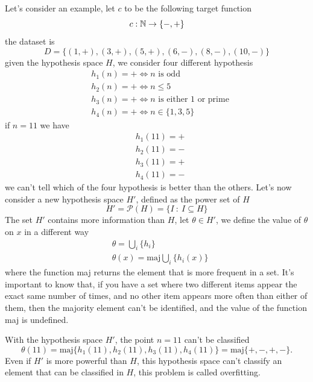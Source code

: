 \documentclass[10pt, letterpaper]{report}
\begin{document}
Let's consider an example, let $c$ to be the following target function\begin{equation}
    c:{\mathbb N}\rightarrow\{-,+\}
\end{equation}
the dataset is\begin{equation}
    D=\{(1,+),(3,+),(5,+),(6,-),
    (8,-),(10,-)\}
\end{equation}
given the hypothesis space $H$, we consider four different hypothesis\begin{align*}
    &h_1(n)=+\iff n\text{ is odd}\\
    &h_2(n)=+\iff n\le 5\\
    &h_3(n)=+\iff n\text{ is either 1 or prime}\\
    &h_4(n)=+\iff n\in\{1,3,5\}
\end{align*}
if $n=11$ we have\begin{align*}
    &h_1(11)=+\\
    &h_2(11)=-\\
    &h_3(11)=+\\
    &h_4(11)=-
\end{align*}
we can't tell which of the four hypothesis is better than the others. Let's now consider a new hypothesis space $H'$, defined as the power set of $H$\begin{equation}
    H'=\mathcal P(H)=\{I \ : \ I\subseteq H\}
\end{equation}
The set $H'$ contains more information than $H$, let $\theta\in H'$, we define the value of $\theta$ on $x$ in a different way\begin{align}
    &\theta = \bigcup_i\{h_i\}\\
    &\theta(x)=\text{maj}\bigcup_i\{h_i(x)\}
\end{align}
where the function maj returns the element that is more frequent in a set. It's important to know that, if you have a set where two different items appear the exact same number of times, and no other item appears more often than either of them, then the majority element can't be identified, and the value of the function maj is undefined.\bigskip

With the hypothesis space $H'$, the point $n=11$ can't be classified\begin{equation}
    \theta(11)=\text{maj}\{h_1(11),h_2(11),h_3(11),h_4(11)\}=\text{maj}\{+,-,+,-\}.
\end{equation}
Even if $H'$ is more powerful than $H$, this hypothesis space can't classify an element that can be classified in $H$, this problem is called overfitting.\bigskip
\end{document}
